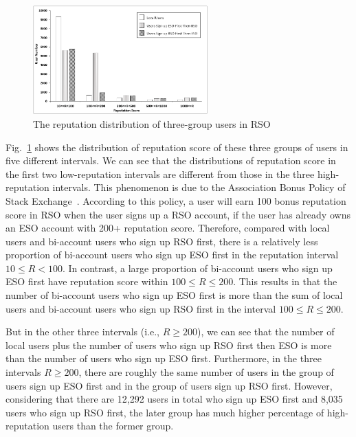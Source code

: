 \begin{figure}
	\includegraphics[width = 0.6\textwidth]{figures/reputation.png}
	\caption{The reputation distribution of three-group users in RSO}
	\label{fig:reputationDistribution}
\end{figure} 

Fig.~\ref{fig:reputationDistribution} shows the distribution of reputation score of these three groups of users in five different intervals.
We can see that the distributions of reputation score in the first two low-reputation intervals are different from those in the three high-reputation intervals.
This phenomenon is due to the Association Bonus Policy of Stack Exchange~\cite{web:associationBonus}.
According to this policy, a user will earn 100 bonus reputation score in RSO when the user signs up a RSO account, if the user has already owns an ESO account with 200+ reputation score.
Therefore, compared with local users and bi-account users who sign up RSO first, there is a relatively less proportion of bi-account users who sign up ESO first in the reputation interval $10 \leq R < 100$.
In contrast, a large proportion of bi-account users who sign up ESO first have reputation score within $100 \leq R \leq 200$.
This results in that the number of bi-account users who sign up ESO first is more than the sum of local users and bi-account users who sign up RSO first in the interval $100 \leq R \leq 200$.

But in the other three intervals (i.e., $R \geq 200$), we can see that the number of local users plus the number of users who sign up RSO first then ESO is more than the number of users who sign up ESO first.
Furthermore, in the three intervals $R \geq 200$, there are roughly the same number of users in the group of users sign up ESO first and in the group of users sign up RSO first.
However, considering that there are 12,292 users in total who sign up ESO first and 8,035 users who sign up RSO first, the later group has much higher percentage of high-reputation users than the former group.


